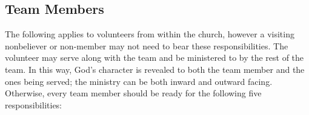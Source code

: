 
\subsection{Team Members}

    The following applies to volunteers from within the church, however a visiting nonbeliever or non-member may not need to bear these responsibilities.
    The volunteer may serve along with the team and be ministered to by the rest of the team.
    In this way, God's character is revealed to both the team member and the ones being served; the ministry can be both inward and outward facing.
    Otherwise, every team member should be ready for the following five responsibilities:






